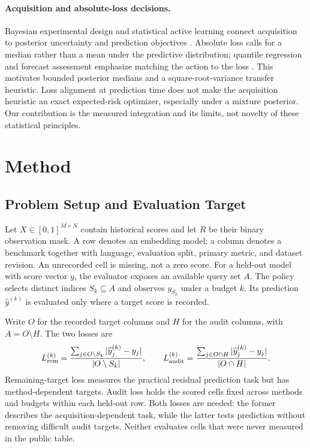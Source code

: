\documentclass{article}
\begin{document}
\paragraph{Acquisition and absolute-loss decisions.}
Bayesian experimental design and statistical active learning connect acquisition to posterior uncertainty and prediction objectives \citep{Chaloner1995Design,Cohn1996Active}. Absolute loss calls for a median rather than a mean under the predictive distribution; quantile regression and forecast assessment emphasize matching the action to the loss \citep{Koenker2001Quantiles,Gneiting2011Forecasts}. This motivates bounded posterior medians and a square-root-variance transfer heuristic. Loss alignment at prediction time does not make the acquisition heuristic an exact expected-risk optimizer, especially under a mixture posterior. Our contribution is the measured integration and its limits, not novelty of these statistical principles.

\section{Method}
\subsection{Problem Setup and Evaluation Target}
Let $X\in[0,1]^{M\times N}$ contain historical scores and let $R$ be their binary observation mask. A row denotes an embedding model; a column denotes a benchmark together with language, evaluation split, primary metric, and dataset revision. An unrecorded cell is missing, not a zero score. For a held-out model with score vector $y$, the evaluator exposes an available query set $A$. The policy selects distinct indices $S_k\subseteq A$ and observes $y_{S_k}$ under a budget $k$. Its prediction $\widehat y^{(k)}$ is evaluated only where a target score is recorded.

Write $O$ for the recorded target columns and $H$ for the audit columns, with $A=O\setminus H$. The two losses are
\begin{equation}
 L_{\rm rem}^{(k)}=\frac{\sum_{j\in O\setminus S_k}|\widehat y_j^{(k)}-y_j|}{|O\setminus S_k|},
 \qquad
 L_{\rm audit}^{(k)}=\frac{\sum_{j\in O\cap H}|\widehat y_j^{(k)}-y_j|}{|O\cap H|}.
 \label{eq:losses}
\end{equation}
Remaining-target loss measures the practical residual prediction task but has method-dependent targets. Audit loss holds the scored cells fixed across methods and budgets within each held-out row. Both losses are needed: the former describes the acquisition-dependent task, while the latter tests prediction without removing difficult audit targets. Neither evaluates cells that were never measured in the public table.
\end{document}
